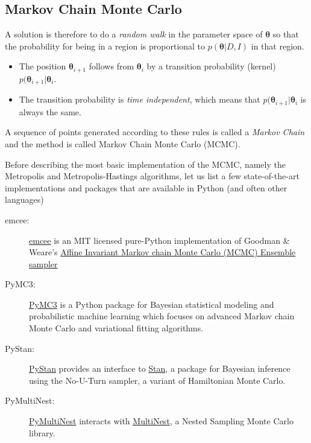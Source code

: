 \documentclass[%
oneside,                 %
final,                   %
10pt]{article}
\begin{document}
\subsection{Markov Chain Monte Carlo}
A solution is therefore to do a \emph{random walk} in the parameter space of $\boldsymbol{\theta}$ so that the probability for being in a region is proportional to $p( \boldsymbol{\theta} | D,I)$ in that region.
\begin{itemize}
\item The position $\boldsymbol{\theta}_{i+1}$ follows from $\boldsymbol{\theta}_i$ by a transition probability (kernel) $p ( \boldsymbol{\theta}_{i+1} | \boldsymbol{\theta}_i$.

\item The transition probability is \emph{time independent}, which means that $p ( \boldsymbol{\theta}_{i+1} | \boldsymbol{\theta}_i$ is always the same.
\end{itemize}

\noindent
A sequence of points generated according to these rules is called a \emph{Markov Chain} and the method is called Markov Chain Monte Carlo (MCMC).

Before describing the most basic implementation of the MCMC, namely the Metropolis and Metropolis-Hastings algorithms, let us list a few state-of-the-art implementations and packages that are available in Python (and often other languages)

\begin{description}
\item[emcee:] 
  \href{{https://emcee.readthedocs.io/en/latest/}}{emcee} is an MIT licensed pure-Python implementation of Goodman {\&} Weare’s \href{{http://msp.berkeley.edu/camcos/2010/5-1/p04.xhtml}}{Affine Invariant Markov chain Monte Carlo (MCMC) Ensemble sampler}

\item[PyMC3:] 
  \href{{https://docs.pymc.io/}}{PyMC3} is a Python package for Bayesian statistical modeling and probabilistic machine learning which focuses on advanced Markov chain Monte Carlo and variational fitting algorithms.

\item[PyStan:] 
  \href{{https://pystan.readthedocs.io/en/latest/}}{PyStan} provides an interface to \href{{http://mc-stan.org/}}{Stan}, a package for Bayesian inference using the No-U-Turn sampler, a variant of Hamiltonian Monte Carlo.

\item[PyMultiNest:] 
  \href{{https://johannesbuchner.github.io/PyMultiNest/}}{PyMultiNest} interacts with \href{{https://github.com/farhanferoz/MultiNest}}{MultiNest}, a Nested Sampling Monte Carlo library.
\end{description}
\end{document}
